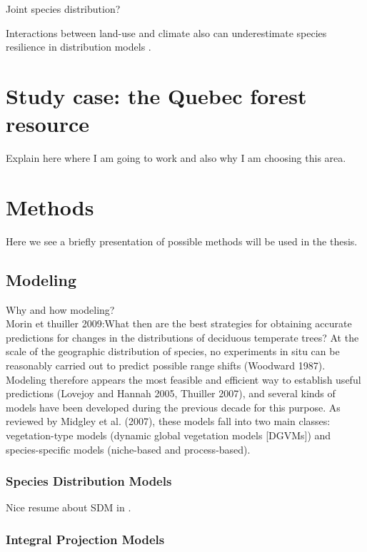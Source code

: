 Joint species distribution?

Interactions between land-use and climate also can underestimate species resilience in distribution models \citep{Goring2017}.

\section{Study case: the Quebec forest resource}

Explain here where I am going to work and also why I am choosing this area.

\section{Methods}

Here we see a briefly presentation of possible methods will be used in the thesis.

\subsection{Modeling}

Why and how modeling?\\
Morin et thuiller 2009:{What then are the best strategies for obtaining accurate predictions for changes in the distributions of deciduous temperate trees? At the scale of the geographic distribution of species, no experiments in situ can be reasonably carried out to predict possible range shifts (Woodward 1987). Modeling therefore appears the most feasible and efficient way to establish useful predictions (Lovejoy and Hannah 2005, Thuiller 2007), and several kinds of models have been developed during the previous decade for this purpose. As reviewed by Midgley et al. (2007), these models fall into two main classes: vegetation-type models (dynamic global vegetation models [DGVMs]) and species-specific models (niche-based and process-based).}

\subsubsection{Species Distribution Models}\label{sdm}

Nice resume about SDM in \citet{Moran-Ordonez2016}.

\subsubsection{Integral Projection Models}

